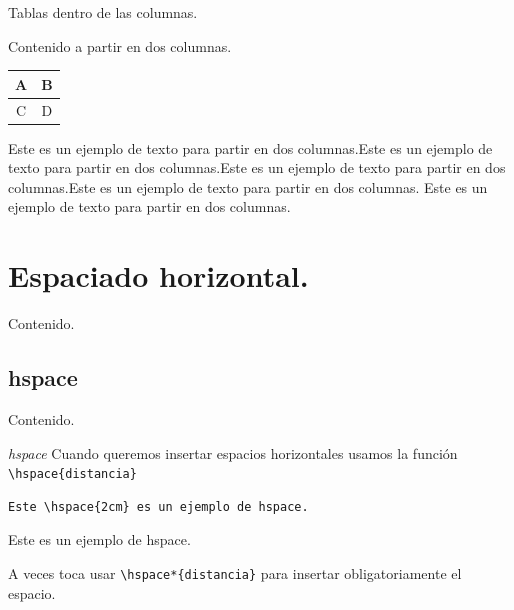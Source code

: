 \documentclass[dvipsnames,xcolor, handout]{beamer}
\theoremstyle{plain}
\theoremstyle{definition}
\begin{document}
\begin{frame}[fragile]{Tablas dentro de las columnas.}

\begin{multicols}{2}
Contenido a partir en dos columnas. 
  
\begin{table}
\centering
\begin{tabular}{|c|c|}
\hline
A & B \\
\hline
C & D \\
\hline
\end{tabular}
\end{table}

Este es un ejemplo de texto para
partir en dos columnas.Este es un ejemplo de texto para
partir en dos columnas.Este es un ejemplo de texto para
partir en dos columnas.Este es un ejemplo de texto para
partir en dos columnas.
Este es un ejemplo de texto para
partir en dos columnas.
\end{multicols}

\end{frame}

\section{Espaciado horizontal.}
\begin{frame}{Contenido.}
 \begin{footnotesize}
\vspace*{-1cm}
\begin{multicols}{2}
  \tableofcontents[currentsection]
\end{multicols}
\end{footnotesize}
\end{frame}

\subsection{hspace}
\begin{frame}{Contenido.}
 \begin{footnotesize}
\vspace*{-1cm}
\begin{multicols}{2}
  \tableofcontents[currentsubsection]
\end{multicols}
\end{footnotesize}
\end{frame}

\begin{frame}[fragile]{\itshape hspace}
    Cuando queremos insertar espacios horizontales usamos la función \verb!\hspace{distancia}!
\begin{verbatim}
Este \hspace{2cm} es un ejemplo de hspace.
\end{verbatim}
Este \hspace{2cm} es un ejemplo de hspace.


A veces toca usar \verb!\hspace*{distancia}! para insertar obligatoriamente el espacio.

\end{frame}
\end{document}
